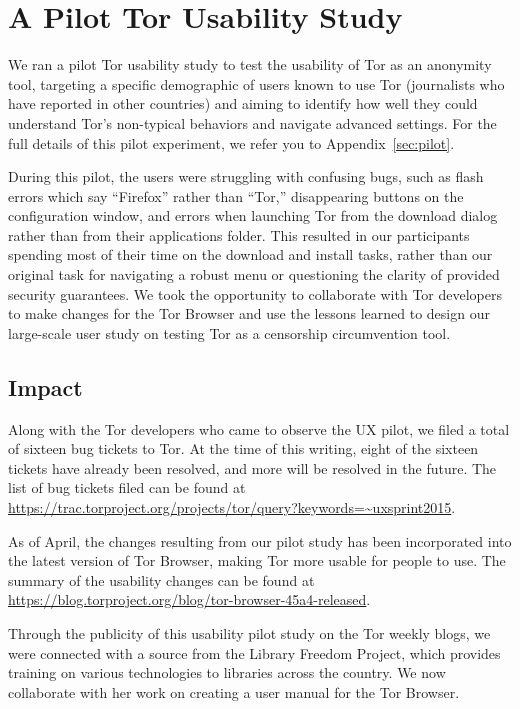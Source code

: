 \documentclass[letterpaper,twocolumn,11pt]{article}
\begin{document}
\section{A Pilot Tor Usability Study} 
\indent \indent We ran a pilot Tor usability study to test the usability of Tor as an anonymity tool,
targeting a specific demographic of users known to use Tor (journalists who have reported in other
countries) and aiming to identify how well they could understand Tor's non-typical behaviors and 
navigate advanced settings. For the full details of this pilot experiment, we refer you to Appendix~\ref{sec:pilot}.  

During this pilot, the users were struggling with confusing bugs, such as flash errors which
say ``Firefox'' rather than ``Tor,'' disappearing buttons on the configuration window, and errors when
launching Tor from the download dialog rather than from their applications folder. This resulted in our 
participants spending most of their time on the download and install tasks, rather than 
our original task for navigating a robust menu or questioning the clarity of provided security 
guarantees. We took the opportunity to collaborate with Tor developers to make changes for the Tor 
Browser and use the lessons learned to design our large-scale user study on testing Tor as a 
censorship circumvention tool. 

\subsection{Impact}
\indent \indent Along with the Tor developers who came to observe the UX pilot, we filed 
a total of sixteen bug tickets to Tor. At the time of  this writing, eight of the sixteen tickets 
have already been resolved, and more will be resolved in the future.  The list of bug
tickets filed can be found at \url{https://trac.torproject.org/projects/tor/query?keywords=~uxsprint2015}. 

As of April, the changes resulting from our pilot study has been incorporated into the latest 
version of Tor Browser, making Tor more usable for people to use. 
The summary of the usability changes can be found at \url{https://blog.torproject.org/blog/tor-browser-45a4-released}. 

Through the publicity of this usability pilot study on the Tor weekly blogs, we were connected
with a source from the Library Freedom Project, which provides training on various technologies 
to libraries across the country. We now collaborate with her work on creating a user manual
for the Tor Browser. 
\end{document}
